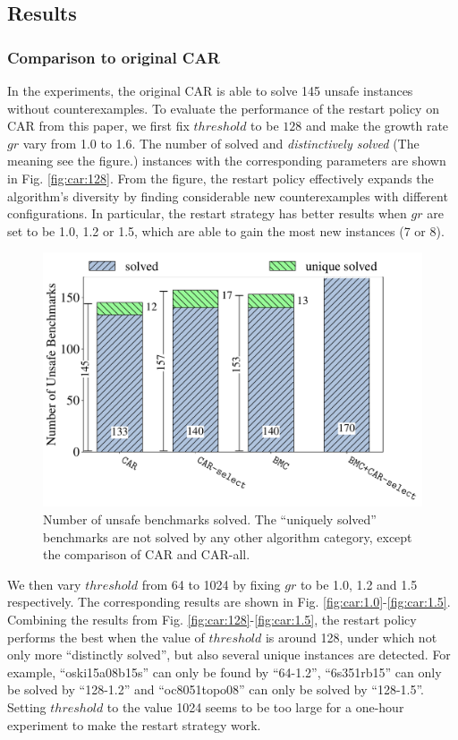 \subsection{Results}

\subsubsection{Comparison to original CAR}
In the experiments, the original CAR is able to solve 145 unsafe instances without counterexamples.
To evaluate the performance of the restart policy on CAR from this paper, we first fix $threshold$ to be $128$ and make the growth rate $gr$ vary from 1.0 to 1.6. The number of solved and \emph{distinctively solved} (The meaning see the figure.) instances with the corresponding parameters are shown in Fig. \ref{fig:car:128}. From the figure, the restart policy effectively expands the algorithm's diversity by finding considerable new counterexamples with different configurations. In particular, the restart strategy has better results when $gr$ are set to be 1.0, 1.2 or 1.5, which are able to gain the most new instances (7 or 8). 
\begin{figure}[!t]
\centering
\includegraphics[width=\linewidth]{images/car-bmc.pdf} 
\caption{Number of unsafe benchmarks solved. The “uniquely solved” benchmarks are not solved by any other algorithm category, except the comparison of CAR and CAR-all.}\label{fig:compare}
\end{figure}

We then vary $threshold$ from 64 to 1024 by fixing $gr$ to be 1.0, 1.2 and 1.5 respectively. The corresponding results are shown in 
Fig. \ref{fig:car:1.0}-\ref{fig:car:1.5}. Combining the results from Fig. \ref{fig:car:128}-\ref{fig:car:1.5}, the restart policy performs the best when the value of $threshold$ is around 128, under which not only more ``distinctly solved'', but also several unique instances are detected. For example, ``oski15a08b15s'' can only be found by ``64-1.2'', ``6s351rb15'' can only be solved by ``128-1.2'' and ``oc8051topo08'' can only be solved by ``128-1.5''. Setting $threshold$ to the value 1024 seems to be too large for a one-hour experiment to make the restart strategy work. 

